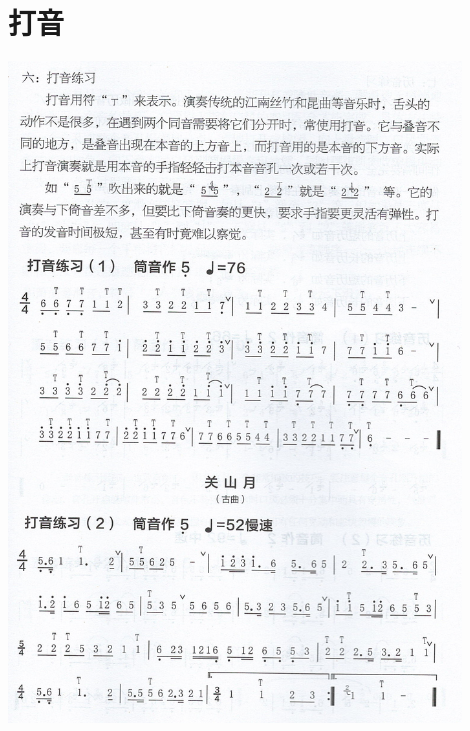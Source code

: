 \documentclass[cn,pad,twocol]{elegantbook}
\begin{document}
\section{打音}                  \includegraphics[width=0.9\textwidth]{dongxiao/Scan 12.jpeg}
\end{document}
